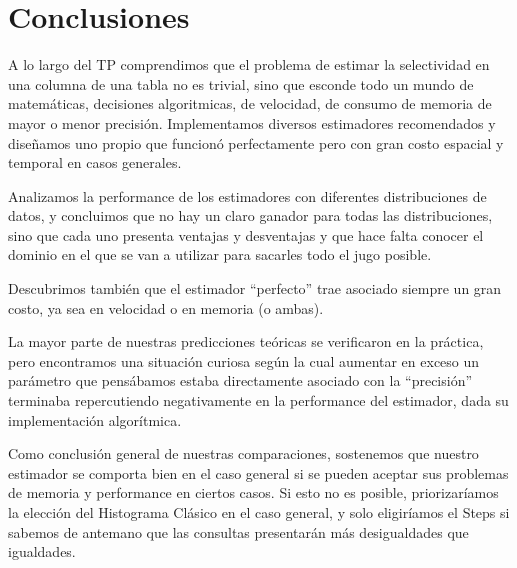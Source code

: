 \section{Conclusiones}
A lo largo del TP comprendimos que el problema de estimar la selectividad en una columna de una tabla no es trivial, sino que esconde todo un mundo de matemáticas, decisiones algoritmicas, de velocidad, de consumo de memoria de mayor o menor precisión. Implementamos diversos estimadores recomendados y diseñamos uno propio que funcionó perfectamente pero con gran costo espacial y temporal en casos generales.

Analizamos la performance de los estimadores con diferentes distribuciones de datos, y concluimos que no hay un claro ganador para todas las distribuciones, sino que cada uno presenta ventajas y desventajas y que hace falta conocer el dominio en el que se van a utilizar para sacarles todo el jugo posible.

Descubrimos también que el estimador ``perfecto'' trae asociado siempre un gran costo, ya sea en velocidad o en memoria (o ambas).

La mayor parte de nuestras predicciones teóricas se verificaron en la práctica, pero encontramos una situación curiosa según la cual aumentar en exceso un parámetro que pensábamos estaba directamente asociado con la ``precisión'' terminaba repercutiendo negativamente en la performance del estimador, dada su implementación algorítmica.

Como conclusión general de nuestras comparaciones, sostenemos que nuestro estimador se comporta bien en el caso general si se pueden aceptar sus problemas de memoria y performance en ciertos casos. Si esto no es posible, priorizaríamos la elección del Histograma Clásico en el caso general, y solo eligiríamos el Steps si sabemos de antemano que las consultas presentarán más desigualdades que igualdades.